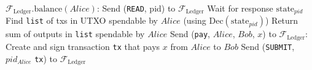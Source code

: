   \begin{algorithmic}[1]
    \State $\mathcal{F}_{\mathrm{Ledger}}\mathrm{.balance}\left(Alice\right)$:
    \State
    \State Send (\texttt{READ}, pid) to $\mathcal{F}_{\mathrm{Ledger}}$ 
    \State Wait for response $\mathrm{state}_{pid}$
    \State Find \texttt{list} of txs in UTXO spendable by $Alice$ (using
    $\mathrm{Dec}\left(\mathrm{state}_{pid}\right)$) 
    \State Return sum of outputs in \texttt{list} spendable by $Alice$ 
    \State
    \State
    \State Send (\texttt{pay}, $Alice$, $Bob$, $x$) to $\mathcal{F}_{\mathrm{Ledger}}$:
    \State
    \State Create and sign transaction \texttt{tx} that pays $x$ from $Alice$ to $Bob$
    \State Send (\texttt{SUBMIT}, $pid_{Alice}$ \texttt{tx}) to
    $\mathcal{F}_{\mathrm{Ledger}}$
  \end{algorithmic}
\hrulefill
